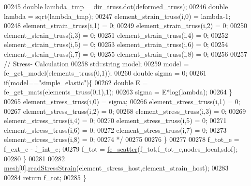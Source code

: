 \begin{DoxyCode}
00245 \textcolor{comment}{        double lambda\_tmp = dir\_truss.dot(deformed\_truss);}
00246 \textcolor{comment}{        double lambda = sqrt(lambda\_tmp);}
00247 \textcolor{comment}{        element\_strain\_truss(i,0) = lambda-1;}
00248 \textcolor{comment}{        element\_strain\_truss(i,1) = 0;}
00249 \textcolor{comment}{        element\_strain\_truss(i,2) = 0;}
00250 \textcolor{comment}{        element\_strain\_truss(i,3) = 0;}
00251 \textcolor{comment}{        element\_strain\_truss(i,4) = 0;}
00252 \textcolor{comment}{        element\_strain\_truss(i,5) = 0;}
00253 \textcolor{comment}{        element\_strain\_truss(i,6) = 0;}
00254 \textcolor{comment}{        element\_strain\_truss(i,7) = 0;}
00255 \textcolor{comment}{        element\_strain\_truss(i,8) = 0;}
00256 \textcolor{comment}{}
00257 \textcolor{comment}{    // Stress- Calculation}
00258 \textcolor{comment}{        std::string model;}
00259 \textcolor{comment}{        model = fe\_get\_model(elements\_truss(0,1));}
00260 \textcolor{comment}{        double sigma = 0;}
00261 \textcolor{comment}{        if(model=="simple\_elastic")\{}
00262 \textcolor{comment}{            double E = fe\_get\_mats(elements\_truss(0,1),1);}
00263 \textcolor{comment}{            sigma = E*log(lambda);}
00264 \textcolor{comment}{        \}}
00265 \textcolor{comment}{        element\_stress\_truss(i,0) = sigma;}
00266 \textcolor{comment}{        element\_stress\_truss(i,1) = 0;}
00267 \textcolor{comment}{        element\_stress\_truss(i,2) = 0;}
00268 \textcolor{comment}{        element\_stress\_truss(i,3) = 0;}
00269 \textcolor{comment}{        element\_stress\_truss(i,4) = 0;}
00270 \textcolor{comment}{        element\_stress\_truss(i,5) = 0;}
00271 \textcolor{comment}{        element\_stress\_truss(i,6) = 0;}
00272 \textcolor{comment}{        element\_stress\_truss(i,7) = 0;}
00273 \textcolor{comment}{        element\_stress\_truss(i,8) = 0;}
00274 \textcolor{comment}{    */}
00275 
00276     \}
00277 
00278     f\_tot\_e = f\_ext\_e - f\_int\_e;
00279     f\_tot = \hyperlink{functions_8h_a6b8344e12f9005795f93f60ddda26c5c}{fe\_scatter}(f\_tot,f\_tot\_e,nodes\_local,sdof);
00280     \}
00281 
00282     \hyperlink{_global_variables_8h_a6e08f89b32254fb4b129720418e7c6ea}{mesh}[0].\hyperlink{class_mesh_a2c1456f1b3b5bda8d213624e3943dbb3}{readStressStrain}(element\_stress\_host,element\_strain\_host);
00283 
00284     \textcolor{keywordflow}{return} f\_tot;
00285 \}
\end{DoxyCode}
